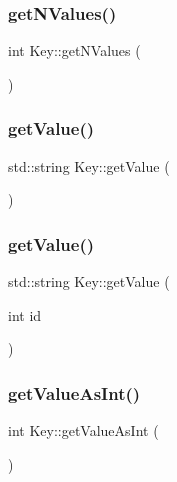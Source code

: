 \mbox{\label{struct_key_a2164f5d7ff7dc435477fdab178f5557a}} 
\subsubsection{\texorpdfstring{get\+N\+Values()}{getNValues()}}
{\footnotesize\ttfamily int Key\+::get\+N\+Values (\begin{DoxyParamCaption}{ }\end{DoxyParamCaption})}

\mbox{\label{struct_key_aefe1fbf42b37b3559561945a78c7511c}} 
\subsubsection{\texorpdfstring{get\+Value()}{getValue()}\hspace{0.1cm}{\footnotesize\ttfamily [1/2]}}
{\footnotesize\ttfamily std\+::string Key\+::get\+Value (\begin{DoxyParamCaption}{ }\end{DoxyParamCaption})}

\mbox{\label{struct_key_a2be25595a7cc739ff609b439fc206fde}} 
\subsubsection{\texorpdfstring{get\+Value()}{getValue()}\hspace{0.1cm}{\footnotesize\ttfamily [2/2]}}
{\footnotesize\ttfamily std\+::string Key\+::get\+Value (\begin{DoxyParamCaption}\item[{int}]{id }\end{DoxyParamCaption})}

\mbox{\label{struct_key_a0633f6b820d00b10167344ca8796c26d}} 
\subsubsection{\texorpdfstring{get\+Value\+As\+Int()}{getValueAsInt()}}
{\footnotesize\ttfamily int Key\+::get\+Value\+As\+Int (\begin{DoxyParamCaption}{ }\end{DoxyParamCaption})}

